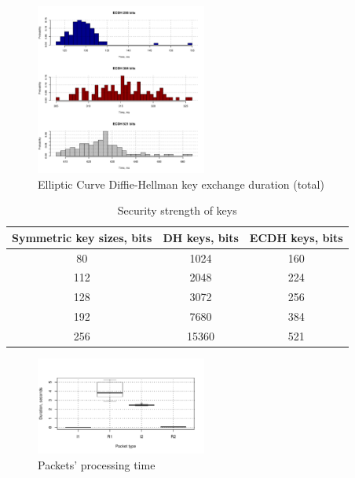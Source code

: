 \begin{figure}
	\includegraphics[width=0.5\textwidth]{graphics/ecdh_computation_hist.pdf}
	\caption{Elliptic Curve Diffie-Hellman key exchange duration (total)}
	\label{fig:ecdh}
\end{figure}

\begin{table}
\centering
\begin{tabular}{|c|c|c|}
\hline
\bf{Symmetric key sizes, bits} & \bf{DH keys, bits} & \bf{ECDH keys, bits} \\\hline
		80			&    1024                        & 160                                  \\
		112			&    2048                        & 224                                  \\
		128			&    3072                        & 256                                  \\
		192			&    7680                        & 384                                  \\
		256			&    15360                       & 521                                  \\
\hline
\end{tabular}
\caption{Security strength of keys}
\label{tab:strength}
\end{table}


\begin{figure}
	\includegraphics[width=0.5\textwidth]{graphics/packet_processing.pdf}
	\caption{Packets' processing time}
	\label{fig:packet_processing}
\end{figure}

